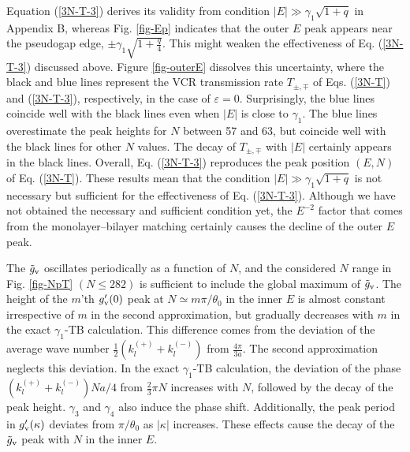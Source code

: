 \documentclass{jpsj3}
\begin{document}
Equation (\ref{3N-T-3}) derives its validity from condition 
$|E| \gg \gamma_1\sqrt{1+q}$ in Appendix B, whereas Fig. \ref{fig-Ep} indicates that the outer $E$ peak
appears near the pseudogap edge, $\pm \gamma_1\sqrt{1+\frac{q}{4}}$.
This might weaken the effectiveness of 
 Eq. (\ref{3N-T-3}) discussed above.
Figure \ref{fig-outerE} dissolves this uncertainty, where 
 the black and blue lines represent the VCR transmission rate $T_{\pm,\mp}$ 
of Eqs. (\ref{3N-T}) and (\ref{3N-T-3}), respectively, in the case of $\varepsilon=0$.
Surprisingly, the blue lines coincide well with the black lines 
even when $|E|$ is close to $\gamma_1$. 
The blue lines overestimate the peak heights
for $N$ between 57 and 63, but coincide well with the black lines 
for other $N$ values. 
The decay of $T_{\pm,\mp}$ with $|E|$ certainly appears in the black lines.
Overall, Eq. (\ref{3N-T-3}) reproduces the peak position $(E,N)$
of Eq. (\ref{3N-T}).
These results mean that
 the condition $|E| \gg \gamma_1\sqrt{1+q}$ is not necessary 
but sufficient for the effectiveness of Eq. (\ref{3N-T-3}).
Although we have not obtained the necessary and sufficient
condition yet, the $E^{-2}$ factor that comes
from the monolayer--bilayer matching certainly causes the decline of the outer $E$ peak.



The $\tilde{g}_{\rm v}$
oscillates periodically as a function
of $N$, and the considered $N$ range in Fig. \ref{fig-NpT}
$(N \leq 282)$ is sufficient to include
the global maximum of $\tilde{g}_{\rm v}$.
The height of the $m$'th $g'_{\rm v}(0)$ peak at $N\simeq m\pi/\theta_0$ 
in the inner $E$ is almost constant irrespective of $m$ in the second approximation,
 but gradually decreases with $m$ in the exact $\gamma_1$-TB calculation.
This difference comes from the deviation of the average wave number $\frac{1}{2}(k^{(+)}_l+k^{(-)}_l)$ from $\frac{4\pi}{3a}$.
The second approximation neglects this deviation.
In the exact $\gamma_1$-TB calculation,
 the deviation of the phase $(k^{(+)}_l+k^{(-)}_l)Na/4$ from $\frac{2}{3}\pi N$ 
increases with $N$, followed by the decay of the peak height.
 $\gamma_3$ and $\gamma_4$ also induce the phase shift.
Additionally, the peak period in $g'_{\rm v}(\kappa)$
deviates from $\pi/\theta_0$ as $|\kappa|$ increases.
These effects cause the decay of the 
$\tilde{g}_{\rm v}$ peak with $N$ in the inner $E$.
\end{document}
